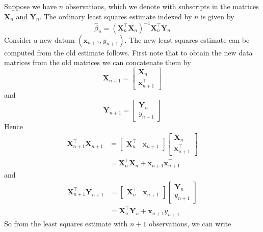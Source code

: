\documentclass[11pt]{report} %
\begin{document}
Suppose we have $n$ observations, which we denote with subscripts in the matrices $\mathbf{X}_{n}$ and $\mathbf{Y}_{n}$. The ordinary least squares estimate indexed by $n$ is given by
\begin{equation}
\hat{\beta}_{n} = \left(\mathbf{X}_{n}^{\top}\mathbf{X}_{n}\right)^{-1}\mathbf{X}_{n}^{\top}\mathbf{Y}_{n}
\end{equation}
Consider a new datum $\left(\mathbf{x}_{n + 1}, y_{n + 1}\right)$. The new least squares estimate can be computed from the old estimate follows. First note that to obtain the new data matrices from the old matrices we can concatenate them by
\begin{equation}
\mathbf{X}_{n + 1} = \begin{bmatrix}
\mathbf{X}_{n} \\ \mathbf{x}_{n + 1}^{\top}
\end{bmatrix}
\end{equation}
and
\begin{equation}
\mathbf{Y}_{n + 1} = \begin{bmatrix}
\mathbf{Y}_{n} \\ y_{n + 1}
\end{bmatrix}
\end{equation}
Hence
\begin{align}
\mathbf{X}_{n + 1}^{\top}\mathbf{X}_{n + 1} &= \begin{bmatrix}
\mathbf{X}_{n}^{\top} & \mathbf{x}_{n + 1}
\end{bmatrix}\begin{bmatrix}
\mathbf{X}_{n} \\ \mathbf{x}_{n + 1}^{\top}
\end{bmatrix} \\
&= \mathbf{X}_{n}^{\top}\mathbf{X}_{n} + \mathbf{x}_{n + 1}\mathbf{x}_{n + 1}^{\top}
\end{align}
and
\begin{align}
\mathbf{X}_{n + 1}^{\top}\mathbf{Y}_{n + 1} &= \begin{bmatrix}
\mathbf{X}_{n}^{\top} & \mathbf{x}_{n + 1}
\end{bmatrix}\begin{bmatrix}
\mathbf{Y}_{n} \\ y_{n + 1}
\end{bmatrix} \\
&= \mathbf{X}_{n}^{\top}\mathbf{Y}_{n} + \mathbf{x}_{n + 1}y_{n + 1}
\end{align}
So from the least squares estimate with $n + 1$ observations, we can write
\end{document}
